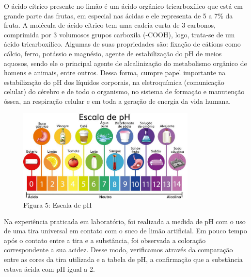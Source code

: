             \indent O ácido cítrico presente no limão é um ácido orgânico tricarboxílico que está em grande parte das frutas, em especial nas ácidas e ele representa de 5 a 7\% da fruta. A molécula de ácido cítrico tem uma cadeia curta de 3 carbonos, comprimida por 3 volumosos grupos carboxila (-COOH), logo, trata-se de um ácido tricarboxílico. Algumas de suas propriedades são: fixação de cátions como cálcio, ferro, potássio e magnésio, agente de estabilização do pH de meios aquosos, sendo ele o principal agente de alcalinização do metabolismo orgânico de homens e animais, entre outros. Dessa forma, cumpre papel importante na estabilização do pH dos líquidos corporais, na eletroquímica (comunicação celular) do cérebro e de todo o organismo, no sistema de formação e manutenção óssea, na respiração celular e em toda a geração de energia da vida humana.\\

            \begin{figure}[h]
                \centering
                \includegraphics[width=0.8\textwidth]{pictures/schematic}
                \caption{Figura 5: Escala de pH}
                \label{fig:esquema}
            \end{figure}

            \indent Na experiência praticada em laboratório, foi realizada a medida de pH com o uso de uma tira universal em contato com o suco de limão artificial. Em pouco tempo após o contato entre a tira e a substância, foi observada a coloração correspondente a sua acidez. Desse modo, verificamos através da comparação entre as cores da tira utilizada e a tabela de pH, a confirmação que a substância estava ácida com pH igual a 2.\\

